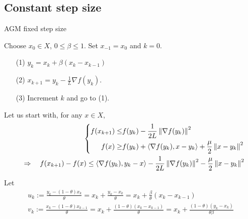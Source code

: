 \documentclass[english,12pt,a4paper]{article}
\begin{document}
\subsection{Constant step size}\label{subsec:}
%
%
\begin{yellow}
\begin{algorithm}[H]
\caption{AGM fixed step size} 
\label{algorithm:AGMfixed} 
%
Choose $x_0\in X$, $0\le \beta \le 1$. Set $x_{-1}=x_0$ and $k=0$.
%
\begin{itemize}
\item[(1)] $y_{k} = x_{k} + \beta(x_{k}-x_{k-1})$
\item[(2)] $x_{k+1} = y_k- \frac1L \nabla f(y_k)$.
\item[(3)] Increment $k$ and go to (1).
\end{itemize}
%
\end{algorithm}
\end{yellow}
%

Let us start with, for any $x\in X$,
%
%
\begin{align*}
%
\left\{
\begin{aligned}
f(x_{k+1}) \le&   f(y_k)  -\frac{1}{2L}\norm{\nabla f(y_k)}^2\\
f(x) \ge& f(y_k) + \scp{\nabla f(y_k)}{x-y_k} + \frac{\mu}{2}\norm{x-y_k}^2
\end{aligned}
\right.\\
\quad\Rightarrow\quad 
f(x_{k+1})-f(x)\le \scp{\nabla f(y_k)}{y_k-x} -\frac{1}{2L}\norm{\nabla f(y_k)}^2  -\frac{\mu}{2}\norm{x-y_k}^2
%
\end{align*}
%

Let 
%
\begin{align*}
 u_k := \frac{y_k-(1-\theta)x_k}{\theta} = x_k + \frac{y_k-x_k}{\theta}= x_k + \frac{\beta}{\theta}(x_k-x_{k-1})\\
v_k := \frac{x_k-(1-\theta)x_{k-1}}{\theta}  = x_{k} + \frac{(1-\theta)(x_k-x_{k-1})}{\theta} = x_{k} + \frac{(1-\theta)(y_k-x_{k})}{\theta\beta}
\end{align*}
%
\end{document}
